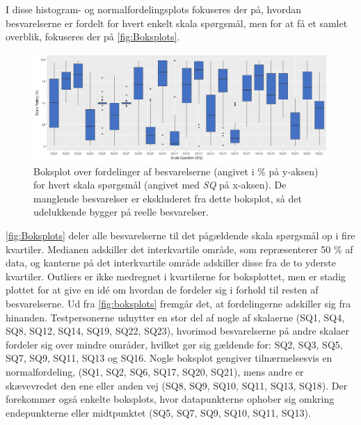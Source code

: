 \noindent
%
I disse histogram- og normalfordelingsplots fokuseres der på, hvordan besvarelserne er fordelt for hvert enkelt skala spørgsmål, men for at få et samlet overblik, fokuseres der på \autoref{fig:Boksplots}. 
%
\begin{figure}[H]
\centering
\includegraphics[width = \textwidth]{Figure/DatabehandlingSkalaer/BoksplotUden0er} 
\caption{Boksplot over fordelinger af besvarelserne (angivet i \% på y-aksen) for hvert skala spørgsmål (angivet med \textit{SQ} på x-aksen). De manglende besvarelser er ekskluderet fra dette boksplot, så det udelukkende bygger på reelle besvarelser.}
\label{fig:Boksplots}
\end{figure}
\noindent
%
\autoref{fig:Boksplots} deler alle besvarelserne til det pågældende skala spørgsmål op i fire kvartiler. Medianen adskiller det interkvartile område, som repræsenterer 50 \% af data, og kanterne på det interkvartile område adskiller disse fra de to yderste kvartiler. Outliers er ikke medregnet i kvartilerne for boksplottet, men er stadig plottet for at give en idé om hvordan de fordeler sig i forhold til resten af besvarelserne. \blankline
%
Ud fra \autoref{fig:boksplots} fremgår det, at fordelingerne adskiller sig fra hinanden. Testpersonerne udnytter en stor del af nogle af skalaerne (SQ1, SQ4, SQ8, SQ12, SQ14, SQ19, SQ22, SQ23), hvorimod besvarelserne på andre skalaer fordeler sig over mindre områder, hvilket gør sig gældende for: SQ2, SQ3, SQ5, SQ7, SQ9, SQ11, SQ13 og SQ16. Nogle boksplot gengiver tilnærmelsesvis en normalfordeling, (SQ1, SQ2, SQ6, SQ17, SQ20, SQ21), mens andre er skævevredet den ene eller anden vej (SQ8, SQ9, SQ10, SQ11, SQ13, SQ18). Der forekommer også enkelte boksplots, hvor datapunkterne ophober sig omkring endepunkterne eller midtpunktet (SQ5, SQ7, SQ9, SQ10, SQ11, SQ13). \blankline
%
